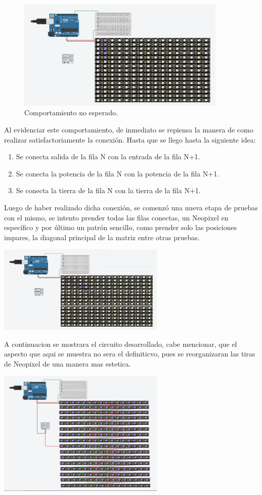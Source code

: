 \documentclass{article}
\begin{document}
\begin{figure}[h]
  \includegraphics[width=10cm]{figura_2.png}
  \centering
  \caption{Comportamiento no esperado.}
  \label{fig:por_columnas}
\end{figure}
Al evidenciar este comportamiento, de inmediato se repiensa la manera de como realizar satisfactoriamente la conexión. Hasta que se llego hasta la siguiente idea:
\begin{enumerate}
    \item Se conecta salida de la fila N con la entrada de la fila N+1.
    \item Se conecta la potencia de la fila N con la potencia de la fila N+1.
    \item Se conecta la tierra de la fila N con la tierra de la fila N+1.
\end{enumerate}
Luego de haber realizado dicha conexión, se comenzó una nueva etapa de pruebas con el mismo, se intento prender todas las filas conectas, un Neopixel en específico y por último un patrón sencillo, como prender solo las posiciones impares, la diagonal principal de la matriz entre otras pruebas.

\centering
\includegraphics[width=8cm]{figura_3.png}
  
A continuacion se mostrara el circuito desarrollado, cabe mencionar, que el aspecto que aqui se muestra no sera el definiticvo, pues se reorganizaran las tiras de Neopixel de una manera mas estetica.

\centering
\includegraphics[width=8cm]{figura_4.png}
\end{document}
